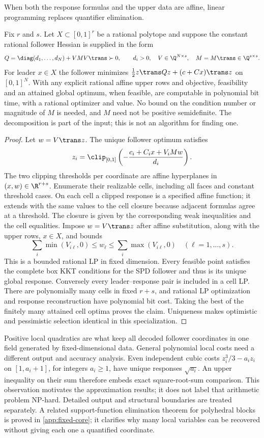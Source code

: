 When both the response formulas and the upper data are affine, linear
programming replaces quantifier elimination.
\begin{corollary}\label{cor:low-rank-lp}
Fix $r$ and $s$. Let $X\subset[0,1]^r$ be a rational polytope and
suppose the constant rational follower Hessian is supplied in the form
\[
        Q=\diag(d_1,\ldots,d_N)+VMV\trans\succ0,
 \qquad d_i>0,\quad V\in\Q^{N\times s},\quad M=M\trans\in\Q^{s\times s}.
\]
For leader $x\in X$ the follower minimizes
$\tfrac12z\trans Qz+(c+Cx)\trans z$ on $[0,1]^N$.
With any explicit rational affine upper rows and objective, feasibility
and an attained global optimum, when feasible, are computable in
polynomial bit time, with a rational optimizer and value.
No bound on the condition number or magnitude of $M$ is needed, and
$M$ need not be positive semidefinite. The decomposition is part of the
input; this is not an algorithm for finding one.
\end{corollary}
\begin{proof}
Let $w=V\trans z$. The unique follower optimum satisfies
\[
 z_i=\clip_{[0,1]}\left(-\frac{c_i+C_ix+V_iMw}{d_i}\right).
\]
The two clipping thresholds per coordinate are affine hyperplanes in
$(x,w)\in\R^{r+s}$. Enumerate their realizable cells, including all
faces and constant threshold cases. On each cell a clipped response is
a specified affine function; it extends with the same values to the
cell closure because adjacent formulas agree at a threshold. The
closure is given by the corresponding weak inequalities and the
cell equalities. Impose $w=V\trans z$ after affine substitution,
along with the upper rows, $x\in X$, and bounds
\[
       \sum_i\min(V_{i\ell},0)\le w_\ell\le
       \sum_i\max(V_{i\ell},0)\quad(\ell=1,\ldots,s).
\]
This is a bounded rational LP in fixed dimension. Every feasible point
satisfies the complete box KKT conditions for the SPD follower and thus
is its unique global response. Conversely every leader--response pair
is included in a cell LP. There are polynomially many cells in fixed
$r+s$, and rational LP optimization and response reconstruction have
polynomial bit cost. Taking the best of the finitely many attained cell
optima proves the claim. Uniqueness makes optimistic and pessimistic
selection identical in this specialization.
\end{proof}

Positive local quadratics are what keep all decoded follower coordinates
in one field generated by fixed-dimensional data. General polynomial
local costs need a different output and accuracy analysis. Even independent
cubic costs $z_i^3/3-a_i z_i$ on $[1,a_i+1]$, for integers $a_i\ge1$,
have unique responses $\sqrt{a_i}$. An upper inequality on their sum
therefore embeds exact square-root-sum comparison. This observation
motivates the approximation results; it does not label that arithmetic
problem NP-hard. Detailed output and structural boundaries are treated
separately. A related support-function elimination theorem for polyhedral
blocks is proved in \cref{app:fixed-core}; it clarifies why many local
variables can be recovered without giving each one a quantified coordinate.
